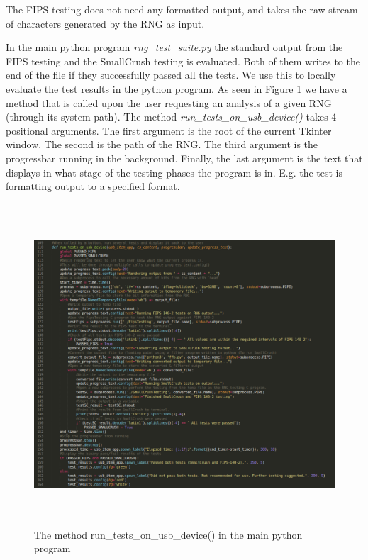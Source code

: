 \documentclass[]{final_report}
\begin{document}
\par{The FIPS testing does not need any formatted output, and takes the raw stream of characters generated by the RNG as input.}

\par{In the main python program \textit{rng\_test\_suite.py} the standard output from the FIPS testing and the SmallCrush testing is evaluated. Both of them writes to the end of the file if they successfully passed all the tests. We use this to locally evaluate the test results in the python program. As seen in Figure \ref{fig:code_cutout_run_tests} we have a method that is called upon the user requesting an analysis of a given RNG (through its system path). The method \textit{run\_tests\_on\_usb\_device()} takes 4 positional arguments. The first argument is the root of the current Tkinter window. The second is the path of the RNG. The third argument is the progressbar running in the background. Finally, the last argument is the text that displays in what stage of the testing phases the program is in. E.g. the test is formatting output to a specified format.}

\begin{figure}[h!]
\begin{center}
\includegraphics[height=12cm]{code_cutout_run_tests}
\caption{The method run\_tests\_on\_usb\_device() in the main python program}
\label{fig:code_cutout_run_tests}
\end{center}
\end{figure}
\end{document}
